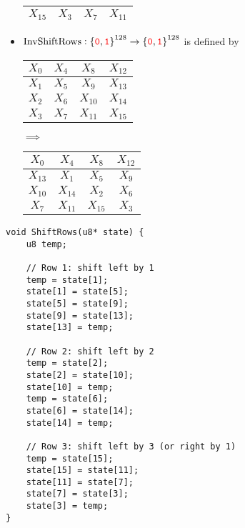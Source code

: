 \begin{itemize}
\begin{center}
\begin{minipage}{.4\textwidth}
\begin{tabular}{|c|c|c|c|}
		\cellcolor{blue!20}$X_{15}$ & \cellcolor{green!20}$X_3$ & \cellcolor{green!20}$X_7$ & \cellcolor{green!20}$X_{11}$ \\ \hline
	\end{tabular}
\end{minipage}
	\end{center}
	\item $\text{InvShiftRows}:\set{\textcolor{red}{\texttt{0}},\textcolor{red}{\texttt{1}}}^{128}\to\set{\textcolor{red}{\texttt{0}},\textcolor{red}{\texttt{1}}}^{128}$ is defined by
	\begin{center}
	\begin{minipage}{.4\textwidth}\centering
	\begin{tabular}{|c|c|c|c|}
		\hline
		\cellcolor{red!20}$X_0$ & \cellcolor{red!20}$X_4$ & \cellcolor{red!20}$X_8$ & \cellcolor{red!20}$X_{12}$ \\ \hline
		\cellcolor{green!20}$X_1$ & \cellcolor{green!20}$X_5$ & \cellcolor{green!20}$X_9$ & \cellcolor{blue!20}$X_{13}$ \\ \hline
		\cellcolor{green!20}$X_2$ & \cellcolor{green!20}$X_6$ & \cellcolor{blue!20}$X_{10}$ & \cellcolor{blue!20}$X_{14}$ \\ \hline
		\cellcolor{green!20}$X_3$ & \cellcolor{blue!20}$X_7$ & \cellcolor{blue!20}$X_{11}$ & \cellcolor{blue!20}$X_{15}$ \\ \hline
	\end{tabular}
\end{minipage}$\implies$\begin{minipage}{.4\textwidth}\centering
	\begin{tabular}{|c|c|c|c|}
		\hline
		\cellcolor{red!20}$X_0$ & \cellcolor{red!20}$X_4$ & \cellcolor{red!20}$X_8$ & \cellcolor{red!20}$X_{12}$ \\ \hline
		\cellcolor{blue!20}$X_{13}$ & \cellcolor{green!20}$X_1$ & \cellcolor{green!20}$X_{5}$ & \cellcolor{green!20}$X_9$ \\ \hline
		\cellcolor{blue!20}$X_{10}$ & \cellcolor{blue!20}$X_{14}$ & \cellcolor{green!20}$X_2$ & \cellcolor{green!20}$X_6$ \\ \hline
		\cellcolor{blue!20}$X_{7}$ & \cellcolor{blue!20}$X_{11}$ & \cellcolor{blue!20}$X_{15}$ & \cellcolor{green!20}$X_{3}$ \\ \hline
	\end{tabular}
\end{minipage}
	\end{center}
\end{itemize}
\vspace{24pt}
\begin{lstlisting}[style=C, caption={ShiftRows},captionpos=t]
void ShiftRows(u8* state) {
	u8 temp;
	
	// Row 1: shift left by 1
	temp = state[1];
	state[1] = state[5];
	state[5] = state[9];
	state[9] = state[13];
	state[13] = temp;
	
	// Row 2: shift left by 2
	temp = state[2];
	state[2] = state[10];
	state[10] = temp;
	temp = state[6];
	state[6] = state[14];
	state[14] = temp;
	
	// Row 3: shift left by 3 (or right by 1)
	temp = state[15];
	state[15] = state[11];
	state[11] = state[7];
	state[7] = state[3];
	state[3] = temp;
}
\end{lstlisting}
